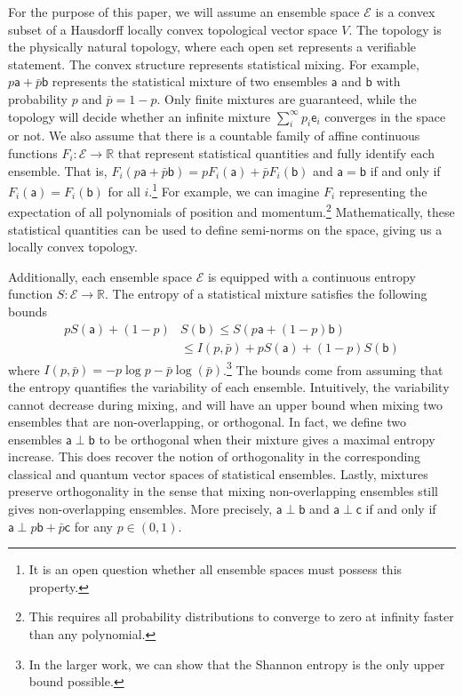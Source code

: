 \documentclass[10pt,twocolumn, nofootinbib]{revtex4-2}
\newcommand{\ens}[1][e] {\mathsf{#1}} %
\newcommand{\Ens}[1][E] {\mathcal{#1}} %
\def\ortho{\perp}
\begin{document}
For the purpose of this paper, we will assume an ensemble space $\Ens$ is a convex subset of a Hausdorff locally convex topological vector space $V$. The topology is the physically natural topology, where each open set represents a verifiable statement. The convex structure represents statistical mixing. For example, $p \ens[a] + \bar{p} \ens[b]$ represents the statistical mixture of two ensembles $\ens[a]$ and $\ens[b]$ with probability $p$ and $\bar{p} = 1 - p$. Only finite mixtures are guaranteed, while the topology will decide whether an infinite mixture $\sum_{i}^{\infty} p_i \ens_i$ converges in the space or not. We also assume that there is a countable family of affine continuous functions $F_i : \Ens \to \mathbb{R}$ that represent statistical quantities and fully identify each ensemble. That is, $F_i(p \ens[a] + \bar{p} \ens[b]) = p F_i(\ens[a]) + \bar{p} F_i(\ens[b])$ and $\ens[a] = \ens[b]$ if and only if $F_i(\ens[a]) = F_i(\ens[b])$ for all $i$.\footnote{It is an open question whether all ensemble spaces must possess this property.} For example, we can imagine $F_i$ representing the expectation of all polynomials of position and momentum.\footnote{This requires all probability distributions to converge to zero at infinity faster than any polynomial.} Mathematically, these statistical quantities can be used to define semi-norms on the space, giving us a locally convex topology.

Additionally, each ensemble space $\Ens$ is equipped with a continuous entropy function $S : \Ens \to \mathbb{R}$. The entropy of a statistical mixture satisfies the following bounds
\begin{equation}
	\begin{aligned}
		p S(\ens[a]) + (1-p) &S(\ens[b]) \leq S(p \ens[a] + (1-p) \ens[b]) \\
		&\leq I(p,\bar{p}) + p S(\ens[a]) + (1-p) S(\ens[b])
	\end{aligned}
\end{equation}
where $I(p,\bar{p}) = - p \log p - \bar{p} \log(\bar{p})$.\footnote{In the larger work, we can show that the Shannon entropy is the only upper bound possible.} The bounds come from assuming that the entropy quantifies the variability of each ensemble. Intuitively, the variability cannot decrease during mixing, and will have an upper bound when mixing two ensembles that are non-overlapping, or orthogonal. In fact, we define two ensembles $\ens[a] \ortho \ens[b]$ to be orthogonal when their mixture gives a maximal entropy increase. This does recover the notion of orthogonality in the corresponding classical and quantum vector spaces of statistical ensembles. Lastly, mixtures preserve orthogonality in the sense that mixing non-overlapping ensembles still gives non-overlapping ensembles. More precisely, $\ens[a] \ortho \ens[b]$ and $\ens[a] \ortho \ens[c]$ if and only if $\ens[a] \ortho p \ens[b] + \bar{p} \ens[c]$ for any $p \in (0,1)$.
\end{document}
